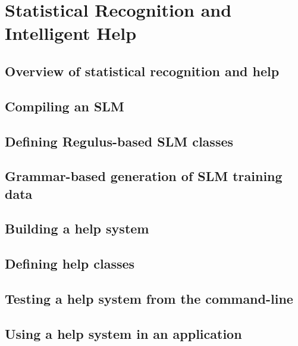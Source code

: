 \chapter{Statistical Recognition and Intelligent Help}
\label{Chapter:SLMAndHelp}

\author{Manny Rayner}

\section{Overview of statistical recognition and help}
\label{Section:SLMHelpOverview}

\section{Compiling an SLM}
\label{Section:SLM}

\section{Defining Regulus-based SLM classes}
\label{Section:SLMClasses}

\section{Grammar-based generation of SLM training data}
\label{Section:SLMGeneration}

\section{Building a help system}
\label{Section:HelpSystemConstruction}

\section{Defining help classes}
\label{Section:HelpSystemClasses}

\section{Testing a help system from the command-line}
\label{Section:HelpSystemCommandLine}

\section{Using a help system in an application}
\label{Section:HelpSystemRuntime}

